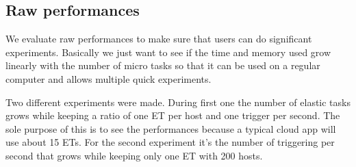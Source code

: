 \documentclass[a4paper, onecolumn, 11pt]{article}
\begin{document}
  \subsection{Raw performances} \label{raw_perf}
    We evaluate raw performances to make sure that users can do significant 
    experiments. Basically we just want to see if the time and memory used grow 
    linearly with the number of micro tasks so that it can be used on a regular 
    computer and allows multiple quick experiments.
  
  	Two different experiments were made. During first one the number of elastic 
  	tasks grows while keeping a ratio of one ET per host and one trigger per 
  	second. The sole purpose of this is to see the performances because a 
  	typical cloud app will use about 15 ETs. For the second experiment it's the 
  	number of triggering per second that grows while keeping only one ET with 
  	200 hosts.
    
\end{document}
